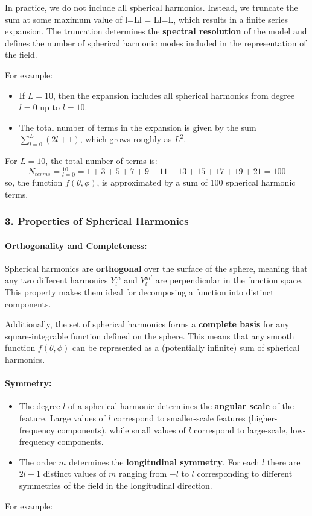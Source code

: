 In practice, we do not include all spherical harmonics. Instead, we truncate the sum at some maximum value of l=Ll = Ll=L, which results in a finite series expansion. The truncation determines the \textbf{spectral resolution} of the model and defines the number of spherical harmonic modes included in the representation of the field.

For example:

\begin{itemize}
	\item If $L=10$, then the expansion includes all spherical harmonics from degree $l=0$ up to $l=10$.
	\item The total number of terms in the expansion is given by the sum $\displaystyle\sum_{l=0}^L(2l+1)$, which grows roughly as $L^2$.
\end{itemize}
For $L=10$, the total number of terms is:
$$N_{terms}=\displaystyle_{l=0}^{10}=1+3+5+7+9+11+13+15+17+19+21=100$$
so, the function $f(\theta,\phi)$, is approximated by a sum of 100 spherical harmonic terms.

\subsubsection{3. \textbf{Properties of Spherical Harmonics}}

\paragraph{\textbf{Orthogonality and Completeness}:}

Spherical harmonics are \textbf{orthogonal} over the surface of the sphere, meaning that any two different harmonics $Y_l^m$ and $Y_{l'}^{m'}$ are perpendicular in the function space. This property makes them ideal for decomposing a function into distinct components.

Additionally, the set of spherical harmonics forms a \textbf{complete basis} for any square-integrable function defined on the sphere. This means that any smooth function $f(\theta,\phi)$ can be represented as a (potentially infinite) sum of spherical harmonics.

\paragraph{\textbf{Symmetry}:}

\begin{itemize}
	\item The degree $l$ of a spherical harmonic determines the \textbf{angular scale} of the feature. Large values of $l$ correspond to smaller-scale features (higher-frequency components), while small values of $l$ correspond to large-scale, low-frequency components.
	\item The order $m$ determines the \textbf{longitudinal symmetry}. For each $l$ there are $2l+1$ distinct values of $m$ ranging from $-l$ to $l$ corresponding to different symmetries of the field in the longitudinal direction.
\end{itemize}
For example:

